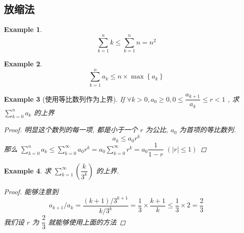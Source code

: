 \documentclass[a4paper, 10pt]{ctexart} %
\newtheorem{example}{Example}
\begin{document}
\subsection{放缩法}
\begin{example}
    \[
    \sum_{k=1} ^{n} k \le \sum_{k=1} ^{n} n = n^{2} 
    \]
\end{example}
\begin{example}
    \[
    \sum_{k=1} ^{n} a_{k} \le n\times \max_{}\left\{a_{k}\right\} 
    \]
\end{example}
\begin{example}[使用等比数列作为上界]
    If $\forall k   > 0 , a_{0} \ge 0,  0 \le \dfrac{a_{k+1}}{a_{k}} \le r < 1$ , 求 $\sum_{k=0}^{n} a_{k}$ 的上界 
    \begin{proof}
        明显这个数列的每一项, 都是小于一个 $r$ 为公比, $a_{0}$ 为首项的等比数列.
        \[
        a_{k} \le a_0 r ^{k} 
        \]
        那么 $\sum\limits^{n}_{k=0} a_{k}\le \sum\limits_{k=0}^{\infty} a_{0} r ^{k} = a_{0} \sum\limits_{ k=0} ^{\infty} r^{k} = a _{0} \dfrac{1}{1-r}$ $\left(\left| r \right|  \le 1\right)$
    \end{proof}
\end{example}
\begin{example}
    求 $\sum\limits_{k=1}^{\infty}  \left( \dfrac{k}{3^{k}}\right)$ 的上界. 
    \begin{proof}
        能够注意到 
        $$a_{k+1}/ a_{k} = \frac{\left(k+1\right) / 3 ^{k +1}}{k / 3 ^{k}} = \frac{1}{3} \times \frac{k+1}{ k} \le \frac{1}{3} \times 2  = \frac{2}{3}$$
        我们设 $r$ 为 $\dfrac{2}{3}$ 就能够使用上面的方法
    \end{proof}
\end{example}
\end{document}
